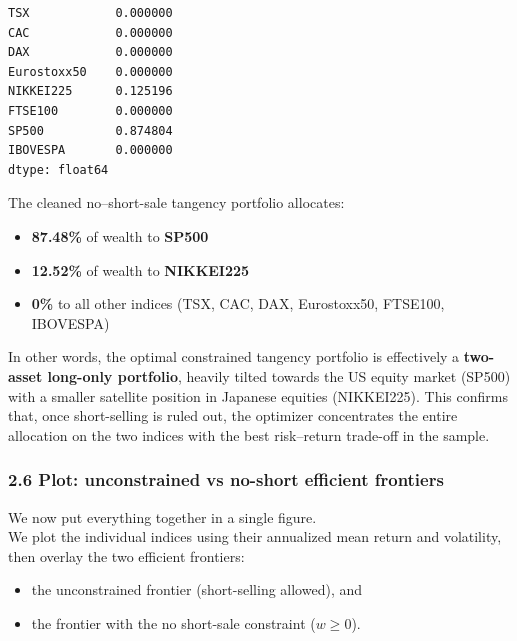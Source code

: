 \documentclass[11pt]{article}
\providecommand{\tightlist}{%
      \setlength{\itemsep}{0pt}\setlength{\parskip}{0pt}}
\begin{document}
            \begin{tcolorbox}[breakable, size=fbox, boxrule=.5pt, pad at break*=1mm, opacityfill=0]
\begin{Verbatim}[commandchars=\\\{\}]
TSX            0.000000
CAC            0.000000
DAX            0.000000
Eurostoxx50    0.000000
NIKKEI225      0.125196
FTSE100        0.000000
SP500          0.874804
IBOVESPA       0.000000
dtype: float64
\end{Verbatim}
\end{tcolorbox}
        
    The cleaned no--short-sale tangency portfolio allocates:

\begin{itemize}
\tightlist
\item
  \textbf{87.48\%} of wealth to \textbf{SP500}
\item
  \textbf{12.52\%} of wealth to \textbf{NIKKEI225}
\item
  \textbf{0\%} to all other indices (TSX, CAC, DAX, Eurostoxx50,
  FTSE100, IBOVESPA)
\end{itemize}

In other words, the optimal constrained tangency portfolio is
effectively a \textbf{two-asset long-only portfolio}, heavily tilted
towards the US equity market (SP500) with a smaller satellite position
in Japanese equities (NIKKEI225). This confirms that, once short-selling
is ruled out, the optimizer concentrates the entire allocation on the
two indices with the best risk--return trade-off in the sample.

    \hypertarget{plot-unconstrained-vs-no-short-efficient-frontiers}{%
\subsubsection{2.6 Plot: unconstrained vs no-short efficient
frontiers}\label{plot-unconstrained-vs-no-short-efficient-frontiers}}

We now put everything together in a single figure.\\
We plot the individual indices using their annualized mean return and
volatility, then overlay the two efficient frontiers:

\begin{itemize}
\tightlist
\item
  the unconstrained frontier (short-selling allowed), and\\
\item
  the frontier with the no short-sale constraint (\(w \ge 0\)).
\end{itemize}
\end{document}
